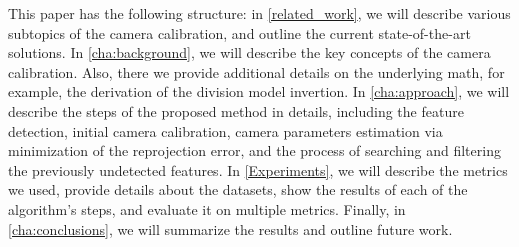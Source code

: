 This paper has the following structure: in \cref{related_work}, we will describe
various subtopics of the camera calibration, and outline the current state-of-the-art solutions.
In \cref{cha:background}, we will describe the key concepts of the camera
calibration. Also, there we provide additional details on the underlying math,
for example, the derivation of the division model invertion. In
\cref{cha:approach}, we will describe the steps of the proposed method in
details, including the feature detection, initial camera calibration, camera
parameters estimation via minimization of the reprojection error, and the
process of searching and filtering the previously undetected features. In
\cref{Experiments}, we will describe the metrics we used, provide details about
the datasets, show the results of each of the algorithm's steps, and evaluate it
on multiple metrics. Finally, in \cref{cha:conclusions}, we will summarize the
results and outline future work.


